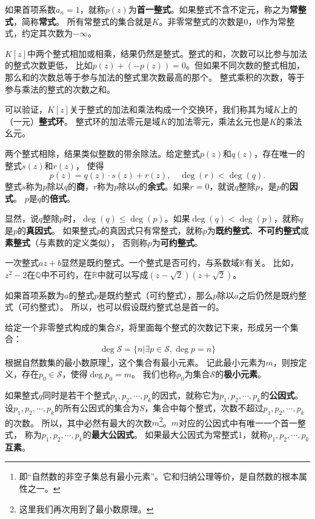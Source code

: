 \documentclass[12pt,UTF8]{ctexbook}
\begin{document}
\begin{appendix}
如果首项系数$a_n = 1$，就称$p(z)$为\textbf{首一整式}。如果整式不含不定元，称之为\textbf{常整式}，简称\textbf{常式}。
所有常整式的集合就是$K$。非零常整式的次数是0，0作为常整式，约定其次数为$-\infty$。

$K[z]$中两个整式相加或相乘，结果仍然是整式。整式的和，次数可以比参与加法的整式次数更低，
比如$p(z) + (-p(z)) = 0$。但如果不同次数的整式相加，那么和的次数总等于参与加法的整式里次数最高的那个。
整式乘积的次数，等于参与乘法的整式的次数之和。

可以验证，$K[z]$关于整式的加法和乘法构成一个交换环，我们称其为域$K$上的（一元）\textbf{整式环}。
整式环的加法零元是域$K$的加法零元，乘法幺元也是$K$的乘法幺元。

两个整式相除，结果类似整数的带余除法。给定整式$p(z)$和$q(z)$，存在唯一的整式$s(z)$和$r(z)$，
使得
$$ p(z) = q(z) \cdot s(z) + r(z),  \quad \deg(r) < \deg(q). $$
整式$s$称为$p$除以$q$的\textbf{商}，$r$称为$p$除以$q$的\textbf{余式}。如果$r = 0$，就说$q$整除$p$，是$p$的\textbf{因式}。
$p$是$q$的\textbf{倍式}。

显然，说$q$整除$p$时，$\deg(q) \leqslant \deg(p)$。如果$\deg(q) < \deg(p)$，就称$q$是$p$的\textbf{真因式}。
如果整式$p$的真因式只有常整式，就称$p$为\textbf{既约整式}、\textbf{不可约整式}或\textbf{素整式}（与素数的定义类似），
否则称$p$为\textbf{可约整式}。

一次整式$az + b$显然是既约整式。一个整式是否可约，与系数域$\mathbb{K}$有关。
比如，$z^2 - 2$在$\mathbb{Q}$中不可约，在$\mathbb{R}$中就可以写成$(z - \sqrt{2})(z + \sqrt{2})$。

如果首项系数为$a$的整式$p$是既约整式（可约整式），那么$p$除以$a$之后仍然是既约整式（可约整式）。
所以，也可以假设既约整式总是首一的。

给定一个非零整式构成的集合$\mathcal{S}$，将里面每个整式的次数记下来，形成另一个集合：
$$\deg \mathcal{S} = \{n | \exists p \in \mathcal{S}, \deg p = n \} $$
根据自然数集的最小数原理\footnote{即“自然数的非空子集总有最小元素”。它和归纳公理等价，是自然数的根本属性之一。}，这个集合有最小元素。
记此最小元素为$m$，则按定义，存在$p_0 \in \mathcal{S}$，使得$\deg p_0 = m$。
我们也称$p_0$为集合$\mathcal{S}$的\textbf{极小元素}。

如果整式$q$同时是若干个整式$p_1, p_2, \cdots , p_k$的因式，就称它为$p_1, p_2, \cdots , p_k$的\textbf{公因式}。
设$p_1, p_2, \cdots , p_k$的所有公因式的集合为$S$，集合中每个整式，次数不超过$p_1, p_2, \cdots , p_k$的次数。
所以，其中必然有最大的次数$m$\footnote{这里我们再次用到了最小数原理。}。$m$对应的公因式中有唯一一个首一整式，
称为$p_1, p_2, \cdots , p_k$的\textbf{最大公因式}。
如果最大公因式为常整式1，就称$p_1, p_2, \cdots , p_k$\textbf{互素}。


\end{appendix}
\end{document}

